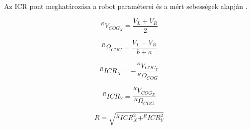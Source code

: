 Az ICR pont meghatározása a robot paraméterei és a mért sebességek alapján \cite{ICRposition}.

\begin{equation}
	^RV_{COG_X} = \frac{V_L + V_R}{2}
\end{equation}

\begin{equation}
	^R\Omega_{COG} = \frac{V_L - V_R}{b+a} 
\end{equation}

\begin{equation}
	^R{ICR_X} = -\frac{^R{V_{COG_Y}}}{^R\Omega_{COG}}
\end{equation}

\begin{equation}
	^R{ICR_Y} = \frac{^R{V_{COG_X}}}{^R\Omega_{COG}}
\end{equation}

\begin{equation}
	R=\sqrt{^R{ICR^2_X} + ^R{ICR^2_Y}}
\end{equation}


